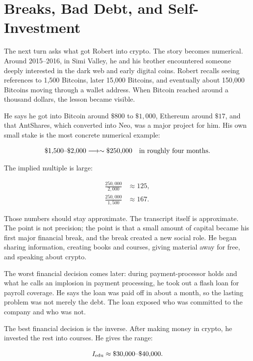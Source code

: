 \section{Breaks, Bad Debt, and Self-Investment}

The next turn asks what got Robert into crypto. The story becomes numerical. Around 2015--2016, in Simi Valley, he and his brother encountered someone deeply interested in the dark web and early digital coins. Robert recalls seeing references to 1,500 Bitcoins, later 15,000 Bitcoins, and eventually about 150,000 Bitcoins moving through a wallet address. When Bitcoin reached around a thousand dollars, the lesson became visible.

He says he got into Bitcoin around \( \$800 \) to \( \$1{,}000 \), Ethereum around \( \$17 \), and that AntShares, which converted into Neo, was a major project for him. His own small stake is the most concrete numerical example:

\begin{equation}
\$1{,}500\hbox{--}\$2{,}000
\longrightarrow
\sim \$250{,}000
\quad \hbox{in roughly four months.}
\end{equation}

The implied multiple is large:

\begin{align}
\frac{250{,}000}{2{,}000} &\approx 125, \\
\frac{250{,}000}{1{,}500} &\approx 167.
\end{align}

Those numbers should stay approximate. The transcript itself is approximate. The point is not precision; the point is that a small amount of capital became his first major financial break, and the break created a new social role. He began sharing information, creating books and courses, giving material away for free, and speaking about crypto.

The worst financial decision comes later: during payment-processor holds and what he calls an implosion in payment processing, he took out a flash loan for payroll coverage. He says the loan was paid off in about a month, so the lasting problem was not merely the debt. The loan exposed who was committed to the company and who was not.

The best financial decision is the inverse. After making money in crypto, he invested the rest into courses. He gives the range:

\begin{equation}
I_{\mathrm{edu}} \approx \$30{,}000\hbox{--}\$40{,}000.
\end{equation}

